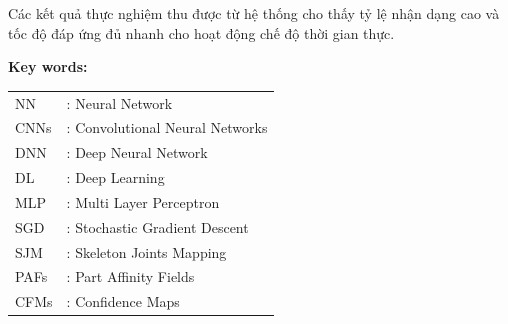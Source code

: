Các kết quả thực nghiệm thu được từ hệ thống cho thấy tỷ lệ nhận dạng cao và tốc độ đáp ứng đủ nhanh cho hoạt động chế độ thời gian thực.

\newpage
\thispagestyle{abstract}
\begin{center}
{}
\end{center}



\textbf{Key words:} 

\newpage
{}
{\fontsize{12pt}{5pt}\selectfont
\tableofcontents}


\newpage
{}
\listoffigures


\newpage
{}
\listoftables


\newpage
\thispagestyle{danhmucviettat}
{}

\FloatBarrier
\begin{table}[h]
\centering
\captionsetup{list=no}
\begin{center}
\begin{tabularx}{\columnwidth}{XX}
NN & : Neural Network \\
CNNs & : Convolutional Neural Networks\\
DNN & : Deep Neural Network \\
DL & : Deep Learning \\
MLP & : Multi Layer Perceptron \\
SGD & : Stochastic Gradient Descent \\
SJM & : Skeleton Joints Mapping \\
PAFs & : Part Affinity Fields  \\
CFMs & : Confidence Maps

\end{tabularx}
\end{center}
\end{table}
\FloatBarrier
